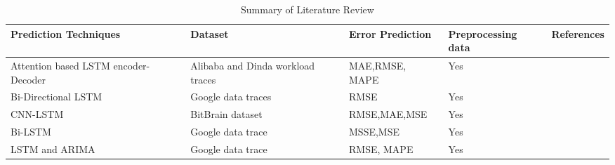 \begin{table}[h]
\caption{Summary of Literature Review} %
\centering %

\begin{tabular}{| m{5em} | m{3cm}| m{3.5cm} |m{3cm}| m{2cm}|} %
\hline\hline %
Prediction Techniques & Dataset & Error Prediction &  Preprocessing data & References \\ 
\hline
Attention based LSTM encoder-Decoder & Alibaba and Dinda workload traces &	MAE,RMSE, MAPE &	Yes &\cite{zhu2019novel}	\\ \hline
Bi-Directional LSTM	 & Google data traces &	RMSE &	Yes	&\cite{gupta2017resource} \\ \hline
CNN-LSTM &	BitBrain dataset &	RMSE,MAE,MSE &	Yes &	\cite{shen2020host} \\ \hline
Bi-LSTM &	Google data trace &	MSSE,MSE &	Yes &	\cite{verma2015large} \\
\hline
LSTM and ARIMA &	Google data trace &	RMSE, MAPE	& Yes	&\cite{janardhanan2017cpu} \\  [1ex]

\hline %

\hline %
\end{tabular}

\label{tab:litreview}
\end{table}

